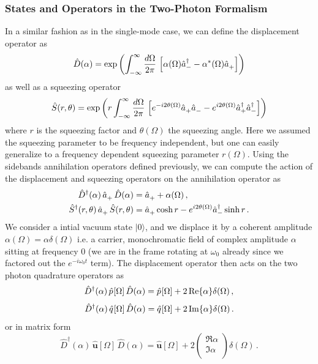 \subsubsection*{States and Operators in the Two-Photon Formalism}
In a similar fashion as in the single-mode case, we can define the displacement operator as
\[\hat{D}(\alpha) = \exp\left( \int^{\infty}_{-\infty} \dfrac{d\Omega}{2\pi} \, \left[ \alpha(\Omega) \hat{a}^\dagger_- - \alpha^*(\Omega) \hat{a}^{\vphantom{\dagger}}_+  \right] \right)\]
as well as a squeezing operator
\[\hat{S}(r, \theta) = \exp\left( r \int^{\infty}_{-\infty} \dfrac{d\Omega}{2\pi} \,\left[ e^{- i 2\theta(\Omega)} \hat{a}^{\vphantom{\dagger}}_+ \hat{a}^{\vphantom{\dagger}}_- - e^{ i 2\theta(\Omega)} \hat{a}^\dagger_+ \hat{a}^\dagger_- \right] \right)\]
where $r$ is the squeezing factor and $\theta(\Omega)$ the squeezing angle. Here we assumed the squeezing parameter to be frequency independent, but one can easily generalize to a frequency dependent squeezing parameter $r(\Omega)$. Using the sidebands annihilation operators defined previously, we can compute the action of the displacement and squeezing operators on the annihilation operator as
\begin{align*}
\hat{D}^\dagger(\alpha) \,\hat{a}^{\vphantom{\dagger}}_+ \,\hat{D}(\alpha) & = \hat{a}^{\vphantom{\dagger}}_+ + \alpha(\Omega) \,, \\
\hat{S}^\dagger(r, \theta) \,\hat{a}^{\vphantom{\dagger}}_+ \,\hat{S}(r, \theta) & = \hat{a}^{\vphantom{\dagger}}_+ \cosh r - e^{i 2 \theta(\Omega)} \hat{a}^\dagger_- \sinh r \,.
\end{align*} 
We consider a intial vacuum state $|0\rangle$, and we displace it by a coherent amplitude $\alpha(\Omega) = \alpha \delta(\Omega)$ i.e. a carrier, monochromatic field of complex amplitude $\alpha$ sitting at frequency 0 (we are in the frame rotating at $\omega_0$ already since we factored out the $e^{-i\omega_0t} $ term). The displacement operator then acts on the two photon quadrature operators as 
\[ \hat{D}^\dagger(\alpha) \,\hat{p}^{\vphantom{\dagger}}[\Omega] \, \hat{D}(\alpha) = \hat{p}^{\vphantom{\dagger}}[\Omega] + 2 \Re{\alpha} \delta(\Omega) \,, \]
\[ \hat{D}^\dagger(\alpha) \,\hat{q}^{\vphantom{\dagger}}[\Omega] \, \hat{D}(\alpha) = \hat{q}^{\vphantom{\dagger}}[\Omega] + 2 \Im{\alpha} \delta(\Omega) \,.\]
or in matrix form
\[\hat{D}^\dagger(\alpha) \,\mathbf{\hat{u}}[\Omega] \, \hat{D}(\alpha) = \mathbf{\hat{u}}[\Omega] + 2 \begin{pmatrix}
\Re{\alpha} \\[4pt]
\Im{\alpha} \\
\end{pmatrix} \delta(\Omega) \,.\]
